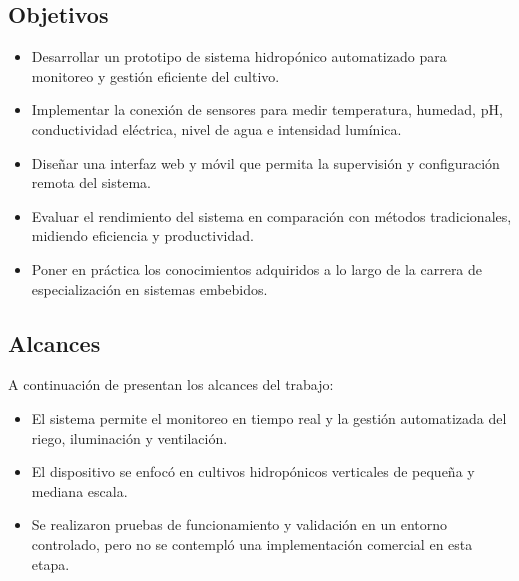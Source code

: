 \subsection{Objetivos}
\begin{itemize}
    \item Desarrollar un prototipo de sistema hidropónico automatizado para monitoreo y gestión eficiente del cultivo.
    \item Implementar la conexión de sensores para medir temperatura, humedad, pH, conductividad eléctrica, nivel de agua e intensidad lumínica.
    \item Diseñar una interfaz web y móvil que permita la supervisión y configuración remota del sistema.
    \item Evaluar el rendimiento del sistema en comparación con métodos tradicionales, midiendo eficiencia y productividad.
    \item Poner en práctica los conocimientos adquiridos a lo largo de la carrera de especialización en sistemas embebidos.
\end{itemize}

\subsection{Alcances}

A continuación de presentan los alcances del trabajo:

\begin{itemize}
    \item El sistema permite el monitoreo en tiempo real y la gestión automatizada del riego, iluminación y ventilación.
    \item El dispositivo se enfocó en cultivos hidropónicos verticales de pequeña y mediana escala.
    \item Se realizaron pruebas de funcionamiento y validación en un entorno controlado, pero no se contempló una implementación comercial en esta etapa.
\end{itemize}






